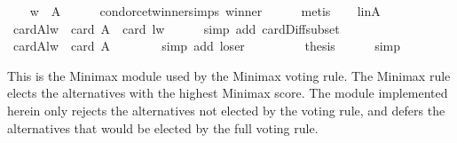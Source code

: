 \begin{isabellebody}
\ \ \isamarkupfalse%
\ {\isachardoublequoteopen}w\ {\isasymin}\ A{\isachardoublequoteclose}\isanewline
\ \ \ \ \isamarkupfalse%
\ condorcet{\isacharunderscore}{\kern0pt}winner{\isachardot}{\kern0pt}simps\ winner\isanewline
\ \ \ \ \isamarkupfalse%
\ metis\isanewline
\ \ \isamarkupfalse%
\ l{\isacharunderscore}{\kern0pt}in{\isacharunderscore}{\kern0pt}A\isanewline
\ \ \isamarkupfalse%
\ {\isachardoublequoteopen}card{\isacharparenleft}{\kern0pt}A{\isacharminus}{\kern0pt}{\isacharbraceleft}{\kern0pt}l{\isacharcomma}{\kern0pt}w{\isacharbraceright}{\kern0pt}{\isacharparenright}{\kern0pt}\ {\isacharequal}{\kern0pt}\ card\ A\ {\isacharminus}{\kern0pt}\ card\ {\isacharbraceleft}{\kern0pt}l{\isacharcomma}{\kern0pt}w{\isacharbraceright}{\kern0pt}{\isachardoublequoteclose}\isanewline
\ \ \ \ \isamarkupfalse%
\ {\isacharparenleft}{\kern0pt}simp\ add{\isacharcolon}{\kern0pt}\ card{\isacharunderscore}{\kern0pt}Diff{\isacharunderscore}{\kern0pt}subset{\isacharparenright}{\kern0pt}\isanewline
\ \ \isamarkupfalse%
\ {\isachardoublequoteopen}card{\isacharparenleft}{\kern0pt}A{\isacharminus}{\kern0pt}{\isacharbraceleft}{\kern0pt}l{\isacharcomma}{\kern0pt}w{\isacharbraceright}{\kern0pt}{\isacharparenright}{\kern0pt}\ {\isacharequal}{\kern0pt}\ card\ A\ {\isacharminus}{\kern0pt}\ {}{\isachardoublequoteclose}\isanewline
\ \ \ \ \isamarkupfalse%
\ {\isacharparenleft}{\kern0pt}simp\ add{\isacharcolon}{\kern0pt}\ loser{\isacharparenright}{\kern0pt}\isanewline
\ \ \isamarkupfalse%
\ {}\ {}\isanewline
\ \ \isamarkupfalse%
\ {\isacharquery}{\kern0pt}thesis\isanewline
\ \ \ \ \isamarkupfalse%
\ simp\isanewline
{}\isamarkupfalse%
%
\endisatagproof
{\isafoldproof}%
%
\isadelimproof
%
\endisadelimproof
%
\isadelimdocument
%
\endisadelimdocument
%
\isatagdocument
%
\isamarkuptrue%
%
\endisatagdocument
{\isafolddocument}%
%
\isadelimdocument
%
\endisadelimdocument
%
\begin{isamarkuptext}%
This is the Minimax module used by the Minimax voting rule. The Minimax rule
elects the alternatives with the highest Minimax score. The module implemented
herein only rejects the alternatives not elected by the voting rule, and defers
the alternatives that would be elected by the full voting rule.%
\end{isamarkuptext}\isamarkuptrue%
%
\isadelimdocument
%
\endisadelimdocument

\end{isabellebody}
